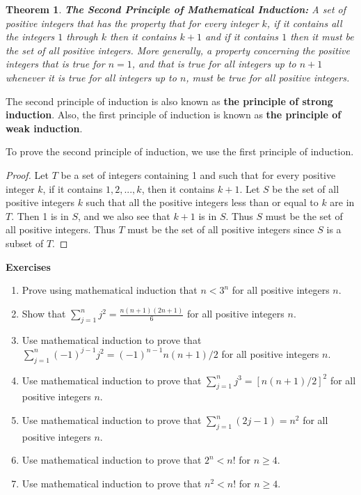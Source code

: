 \documentclass[12pt,letterpaper]{book}
\newtheorem{theorem}{Theorem}
\begin{document}
\begin{theorem}
\textbf{The Second Principle of Mathematical Induction:} A set of
positive integers that has the property that for every integer $k$,
if it contains all the integers $1$ through $k$ then it contains $k+1$
and if it contains $1$ then it must be the set of all positive
integers. More generally, a property concerning the positive
integers that is true for $n=1$, and that is true for all integers
up to $n+1$ whenever it is true for all integers up to $n$, must be
true for all positive integers.
\end{theorem} 
\par The second principle of induction is also known as {\bf{the principle
of strong induction}}.  Also, the first principle of induction is
known as {\bf{the principle of weak induction}}.
\par To prove the second principle of induction, we use the first
principle of induction.
\begin{proof}
Let $T$ be a set of integers containing 1 and such that for every
positive integer $k$, if it contains $1,2,...,k$, then it contains
$k+1$.  Let $S$ be the set of all positive integers $k$ such that
all the positive integers less than or equal to $k$ are in $T$. Then
1 is in $S$, and we also see that $k+1$ is in $S$.  Thus $S$ must be
the set of all positive integers.  Thus $T$ must be the set of all
positive integers since $S$ is a subset of $T$.
\end{proof}

\textbf{Exercises}

\begin{enumerate}
\item{Prove using mathematical induction that $n<3^n$ for all
positive integers $n$.} \item{Show that
$\sum_{j=1}^nj^2=\frac{n(n+1)(2n+1)}{6}$ for all
positive integers $n$.} \item{Use mathematical
induction to prove that
$\sum_{j=1}^n(-1)^{j-1}j^2=(-1)^{n-1}n(n+1)/2$ for all
positive integers $n$.} \item{Use
mathematical induction to prove that $\sum_{j=1}^nj^3=[n(n+1)/2]^2$
for all positive integers $n$.}\item{Use mathematical induction to
prove that $\sum_{j=1}^n(2j-1)=n^2$ for all
positive integers $n$.}\item{Use mathematical induction
to prove that $2^n<n!$ for $n\geq 4$.}\item{Use mathematical
induction to prove that $n^2<n!$ for $n\geq 4$.}
\end{enumerate}
\end{document}
